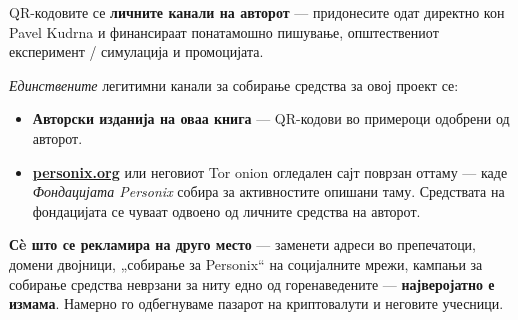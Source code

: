 \begin{minipage}[t]{0.60\textwidth}
\vspace{0pt}
\begin{mdframed}[
  linewidth=0.7pt,roundcorner=5pt,
  innerleftmargin=10pt,innerrightmargin=10pt,
  innertopmargin=8pt,innerbottommargin=8pt,
  skipabove=0pt,skipbelow=0pt,
  linecolor=cbwarning!50,backgroundcolor=cbwarning!5,
  nobreak=true,
  needspace=4\baselineskip,
]
\footnotesize
QR-кодовите се \textbf{личните канали на авторот} --- придонесите одат директно кон Pavel Kudrna и финансираат понатамошно пишување, општествениот експеримент / симулација и промоцијата.

\smallskip
\emph{Единствените} легитимни канали за собирање средства за овој проект се:

\smallskip
\begin{itemize}
\setlength{\itemsep}{0pt}
\setlength{\topsep}{0pt}
\item \textbf{Авторски изданија на оваа книга} --- QR-кодови во примероци одобрени од авторот.
\item \href{https://personix.org}{\textbf{personix.org}} или неговиот Tor onion огледален сајт поврзан оттаму --- каде \emph{Фондацијата Personix} собира за активностите опишани таму. Средствата на фондацијата се чуваат одвоено од личните средства на авторот.
\end{itemize}

\smallskip
\textbf{Сè што се рекламира на друго место} --- заменети адреси во препечатоци, домени двојници, „собирање за Personix“ на социјалните мрежи, кампањи за собирање средства неврзани за ниту едно од горенаведените --- \textbf{најверојатно е измама}. Намерно го одбегнуваме пазарот на криптовалути и неговите учесници.
\end{mdframed}
\end{minipage}

\clearpage
